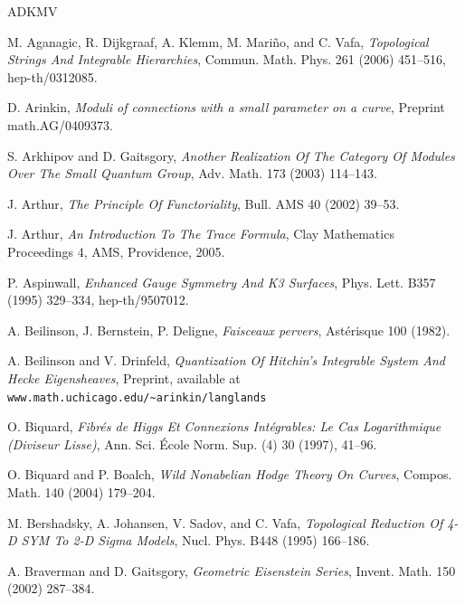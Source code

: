 
\clearpage
\begin{thebibliography}{ADKMV}

 M. Aganagic, R. Dijkgraaf, A. Klemm, M. Mari\~no, and C. Vafa, \emph{Topological Strings And Integrable Hierarchies}, Commun. Math. Phys. 261 (2006) 451--516, hep-th/0312085.

 D. Arinkin, \emph{Moduli of connections with a small parameter on a curve}, Preprint math.AG/0409373.

 S. Arkhipov and D. Gaitsgory, \emph{Another Realization Of The Category Of Modules Over The Small Quantum Group}, Adv. Math. 173 (2003) 114--143.

 J. Arthur, \emph{The Principle Of Functoriality}, Bull. AMS 40 (2002) 39--53.

 J. Arthur, \emph{An Introduction To The Trace Formula}, Clay Mathematics Proceedings 4, AMS, Providence, 2005.

 P. Aspinwall, \emph{Enhanced Gauge Symmetry And K3 Surfaces}, Phys. Lett. B357 (1995) 329--334, hep-th/9507012.

 A. Beilinson, J. Bernstein, P. Deligne, \emph{Faisceaux pervers}, Ast\'erisque 100 (1982).

 A. Beilinson and V. Drinfeld, \emph{Quantization Of Hitchin's Integrable System And Hecke Eigensheaves}, Preprint, available at \texttt{www.math.uchicago.edu/\textasciitilde arinkin/langlands}

 O. Biquard, \emph{Fibr\'es de Higgs Et Connexions Int\'egrables: Le Cas Logarithmique (Diviseur Lisse)}, Ann. Sci. \'Ecole Norm. Sup. (4) 30 (1997), 41--96.

 O. Biquard and P. Boalch, \emph{Wild Nonabelian Hodge Theory On Curves}, Compos. Math. 140 (2004) 179--204.

 M. Bershadsky, A. Johansen, V. Sadov, and C. Vafa, \emph{Topological Reduction Of 4-D SYM To 2-D Sigma Models}, Nucl. Phys. B448 (1995) 166--186.

 A. Braverman and D. Gaitsgory, \emph{Geometric Eisenstein Series}, Invent. Math. 150 (2002) 287--384.


\end{thebibliography}
